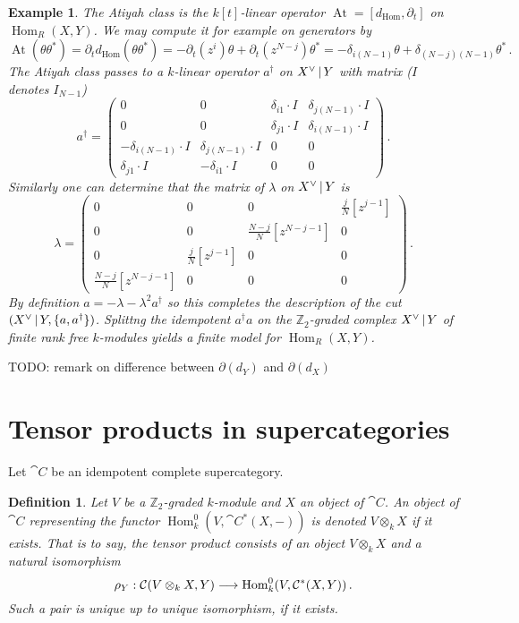\documentclass[english,letter paper,12pt,leqno]{article}
\theoremstyle{example}
\newtheorem{definition}[theorem]{Definition}
\newtheorem{example}[theorem]{Example}
\numberwithin{equation}{section}
\def\Hom{\operatorname{Hom}}
\DeclareMathOperator{\At}{At}
\begin{document}
\begin{example}
The Atiyah class is the $k[t]$-linear operator $\At = [d_{\Hom}, \partial_t]$ on $\Hom_R(X,Y)$. We may compute it for example on generators by
\[
\At( \theta \theta^* ) = \partial_t d_{\Hom}( \theta \theta^* ) = - \partial_t( z^i ) \theta + \partial_t( z^{N-j} ) \theta^* = - \delta_{i (N-1)} \theta + \delta_{(N-j)(N-1)} \theta^*\,.
\]
The Atiyah class passes to a $k$-linear operator $a^\dagger$ on $X^{\vee} \,|\, Y$ with matrix ($I$ denotes $I_{N-1}$)
\begin{equation}\label{eq:aityah_class_hom_example}
a^\dagger = \begin{pmatrix} 0 & 0 & \delta_{i1} \cdot I & \delta_{j(N-1)} \cdot I \\ 
0 & 0 & \delta_{j1} \cdot I & \delta_{i(N-1)} \cdot I \\
- \delta_{i(N-1)} \cdot I & \delta_{j(N-1)} \cdot I & 0 & 0 \\
\delta_{j1} \cdot I & - \delta_{i1} \cdot I & 0 & 0 \end{pmatrix}\,.
\end{equation}
Similarly one can determine that the matrix of $\lambda$ on $X^{\vee} \,|\, Y$ is
\[
\lambda = \begin{pmatrix} 0 & 0 & 0 & \frac{j}{N} [z^{j-1}] \\
0 & 0 & \frac{N-j}{N} [z^{N-j-1}] & 0\\
0 & \frac{j}{N} [z^{j-1}] & 0 & 0\\
\frac{N-j}{N} [z^{N-j-1}] & 0 & 0 & 0\end{pmatrix}\,.
\]
By definition $a = - \lambda - \lambda^2 a^\dagger$ so this completes the description of the cut $( X^{\vee} \,|\, Y, \{ a, a^\dagger \} )$. Splittng the idempotent $a^\dagger a$ on the $\mathbb{Z}_2$-graded complex $X^{\vee} \,|\, Y$ of finite rank free $k$-modules yields a finite model for $\Hom_R(X,Y)$.
\end{example}

TODO: remark on difference between $\partial(d_Y)$ and $\partial(d_X)$

\appendix

\section{Tensor products in supercategories}\label{section:tensorproduct_supcat}

Let $\cat{C}$ be an idempotent complete supercategory.

\begin{definition} Let $V$ be a $\mathbb{Z}_2$-graded $k$-module and $X$ an object of $\cat{C}$. An object of $\cat{C}$ representing the functor $\Hom^0_k( V, \cat{C}^*(X, -))$ is denoted $V \otimes_k X$ if it exists. That is to say, the tensor product consists of an object $V \otimes_k X$ and a natural isomorphism
\[
\rho_Y: \cat{C}( V \otimes_k X, Y ) \lto \Hom^0_k( V, \cat{C}^*(X,Y) )\,.
\]
Such a pair is unique up to unique isomorphism, if it exists.
\end{definition}
\end{document}
